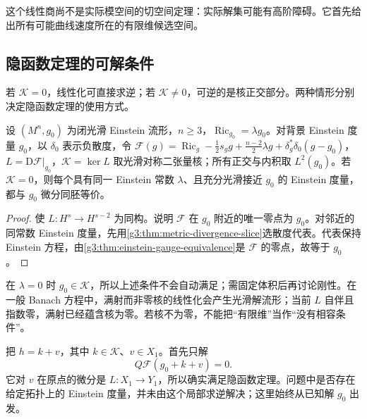 这个线性商尚不是实际模空间的切空间定理：实际解集可能有高阶障碍。它首先给出所有可能曲线速度所在的有限维候选空间。

\subsection{隐函数定理的可解条件}
\label{g3:subsec:2503:03}
若 \(\mathcal K=0\)，线性化可直接求逆；若 \(\mathcal K\ne0\)，可逆的是核正交部分。两种情形分别决定隐函数定理的使用方式。

\begin{corollary}\label{g3:cor:einstein-infinitesimal-rigidity}
	设 \((M^n,g_0)\) 为闭光滑 Einstein 流形，\(n\ge3\)，\(\operatorname{Ric}_{g_0}=\lambda g_0\)。对背景 Einstein 度量 \(g_0\)，以 \(\delta_0\) 表示负散度，令 \(\mathcal F(g)=\operatorname{Ric}_g-\tfrac12s_gg+\tfrac{n-2}2\lambda g+\delta_g^*\delta_0(g-g_0)\)，\(L=\mathrm D\mathcal F|_{g_0}\)，\(\mathcal K=\ker L\) 取光滑对称二张量核；所有正交与内积取 \(L^2(g_0)\)。若 \(\mathcal K=0\)，则每个具有同一 Einstein 常数 \(\lambda\)、且充分光滑接近 \(g_0\) 的 Einstein 度量，都与 \(g_0\) 微分同胚等价。
\end{corollary}
\begin{proof}
	使 \(L:H^s\to H^{s-2}\) 为同构。说明 \(\mathcal F\) 在 \(g_0\) 附近的唯一零点为 \(g_0\)。对邻近的同常数 Einstein 度量，先用\cref{g3:thm:metric-divergence-slice}选散度代表。代表保持 Einstein 方程，由\cref{g3:thm:einstein-gauge-equivalence}是 \(\mathcal F\) 的零点，故等于 \(g_0\)。
\end{proof}

在 \(\lambda=0\) 时 \(g_0\in\mathcal K\)，所以上述条件不会自动满足；需固定体积后再讨论刚性。在一般 Banach 方程中，满射而非零核的线性化会产生光滑解流形；当前 \(L\) 自伴且指数零，满射已经蕴含核为零。若核不为零，不能把“有限维”当作“没有相容条件”。

把 \(h=k+v\)，其中 \(k\in\mathcal K\)、\(v\in X_1\)。首先只解
\begin{equation}\label{g3:eq:einstein-range-equation}
	Q\mathcal F(g_0+k+v)=0.
\end{equation}
它对 \(v\) 在原点的微分是 \(L:X_1\to Y_1\)，所以确实满足隐函数定理。问题中是否存在给定拓扑上的 Einstein 度量，并未由这个局部求逆解决；这里始终从已知解 \(g_0\) 出发。

